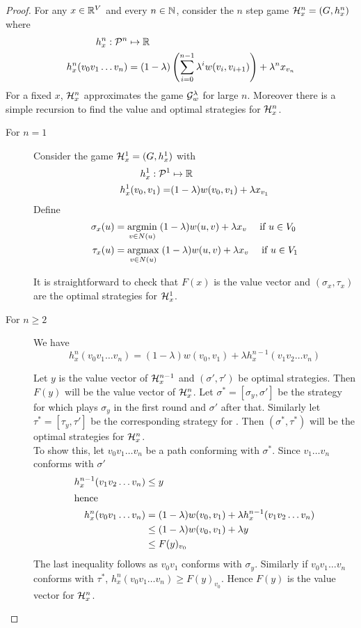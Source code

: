 \begin{proof}
For any $x \in \Reals^V$ and every $n \in \Nat$, consider the $n$  step game $\mc{H}_x^n=(G,h^n_x)$ where
\begin{align*}
    h^n_x : \PF[n] &\mapsto \Reals\\
    h^n_x(v_0v_1 \ldots v_n) &= (1-\lambda)\left(\sum_{i=0}^{n-1} \lambda^i w(v_i,v_{i+1})\right) + \lambda^n x_{v_n}
\end{align*}
For a fixed $x$, $\mc{H}_x^n$ approximates the game $\G^\lambda_w$ for large $n$. Moreover there is a simple recursion to find the value and optimal strategies for $\mc{H}_x^n$.

\begin{description}
    \item[For $n=1$] Consider the game $\mc{H}_x^1=(G,h^1_x)$ with
\begin{align*}
    h^1_x : \PF[1] &\mapsto \Reals\\
    h^1_x (v_0,v_1) = & (1-\lambda) w(v_0,v_1) + \lambda x_{v_1}
\end{align*}
Define
\begin{align*}
    \sigma_x(u) &= \argmin_{ v \in N(u)}\; (1-\lambda) w(u,v) + \lambda x_v \quad \text{ if } u \in V_0\\
    \tau_x(u) &= \argmax_{ v \in N(u)}\; (1-\lambda) w(u,v) + \lambda x_v   \quad \text{ if } u \in V_1
\end{align*}

It is straightforward to check that $F(x)$ is the value vector and $(\sigma_x,\tau_x)$ are the optimal strategies for $\mc{H}_x^1$.

\item[For $n \geq 2$] We have
\[
    h^n_x(v_0v_1 \ldots v_n) = (1-\lambda)w(v_0,v_1) + \lambda h^{n-1}_x(v_1v_2 \ldots v_n)
\]

Let $y$ is the value vector of $\mc{H}_x^{n-1}$ and $(\sigma',\tau')$ be optimal strategies. Then $F(y)$ will be the value vector of $\mc{H}_x^n$. Let $\sigma^*=[\sigma_y,\sigma']$ be the strategy for  which plays $\sigma_y$ in the first round and $\sigma'$ after that. Similarly let $\tau^*=[\tau_y,\tau']$ be the corresponding strategy for . Then $(\sigma^*,\tau^*)$ will be the optimal strategies for $\mc{H}^n_x$.\\
To show this, let $v_0 v_1 \ldots v_n$ be a path conforming with $\sigma^*$. Since $v_1 \ldots v_n$ conforms with $\sigma'$
\begin{align*}
    h^{n-1}_x(v_1 v_2 \ldots v_n) &\leq y\\
    \intertext{hence}
    h^n_x(v_0 v_1 \ldots v_n) &= (1-\lambda) w(v_0,v_1) + \lambda h^{n-1}_x(v_1v_2 \ldots v_n)\\
    &\leq (1-\lambda) w(v_0,v_1) + \lambda y \\
    &\leq F(y)_{v_0}
\end{align*}
The last inequality follows as $v_0v_1$ conforms with $\sigma_y$. Similarly if $v_0 v_1\ldots v_n$ conforms with $\tau^*$, $h^n_x(v_0v_1 \ldots v_n) \geq F(y)_{v_0}$. Hence $F(y)$ is the value vector for $\mc{H}^n_x$.
\end{description}


\end{proof}
